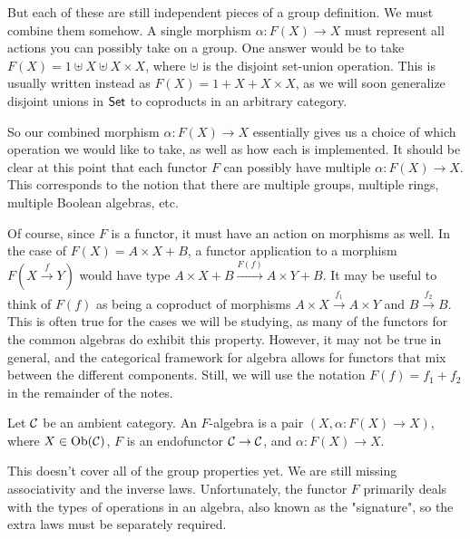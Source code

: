 But each of these are still independent pieces of a group definition.
We must combine them somehow.
A single morphism $\alpha : F(X) \rightarrow X$ must represent all actions you can possibly take on a group.
One answer would be to take $F(X) = 1 \uplus X \uplus X \times X$, where $\uplus$ is the disjoint set-union operation.
This is usually written instead as $F(X) = 1 + X + X \times X$, as we will soon generalize disjoint unions in $\mathsf{Set}$ to coproducts in an arbitrary category.

So our combined morphism $\alpha : F(X) \rightarrow X$ essentially gives us a choice of which operation we would like to take, as well as how each is implemented.
It should be clear at this point that each functor $F$ can possibly have multiple $\alpha : F(X) \rightarrow X$.
This corresponds to the notion that there are multiple groups, multiple rings, multiple Boolean algebras, etc.

Of course, since $F$ is a functor, it must have an action on morphisms as well.
In the case of $F(X) = A \times X + B$, a functor application to a morphism $F(X \xrightarrow{f} Y)$ would have type $A \times X + B \xrightarrow{F(f)} A \times Y + B$.
It may be useful to think of $F(f)$ as being a coproduct of morphisms $A \times X \xrightarrow{f_1} A \times Y$ and $B \xrightarrow{f_2} B$.
This is often true for the cases we will be studying, as many of the functors for the common algebras do exhibit this property.
However, it may not be true in general, and the categorical framework for algebra allows for functors that mix between the different components.
Still, we will use the notation $F(f) = f_1 + f_2$ in the remainder of the notes.

\begin{definition}[$F$-algebra]
  Let $\mathcal C$ be an ambient category. An $F$-algebra is a pair $(X, \alpha : F(X) \rightarrow X)$, where $X \in \operatorname{Ob}(\mathcal C)$, $F$ is an endofunctor $\mathcal C \rightarrow \mathcal C$, and $\alpha : F(X) \rightarrow X$.
\end{definition}

This doesn't cover all of the group properties yet.
We are still missing associativity and the inverse laws.
Unfortunately, the functor $F$ primarily deals with the types of operations in an algebra, also known as the "signature", so the extra laws must be separately required.

